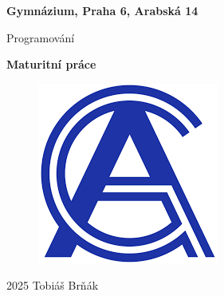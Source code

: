 \begin{titlepage}

\begin{center}

    {\LARGE \textbf{ Gymnázium, Praha 6, Arabská 14}}

    \vspace{1.0cm}

    {\Large Programování}

    \vspace{3.5cm}
 
    {\Huge \textbf{Maturitní práce}}
    
    \vspace{1.0cm}


    \begin{figure}[h]
        \centering
        \includegraphics[width=0.5\linewidth]{Images/logo.png}
    \end{figure}

\end{center}

    \vspace{5.5cm}
    {\LARGE 2025}\hspace{10cm}
    {\Large Tobiáš Brňák}

\end{titlepage}